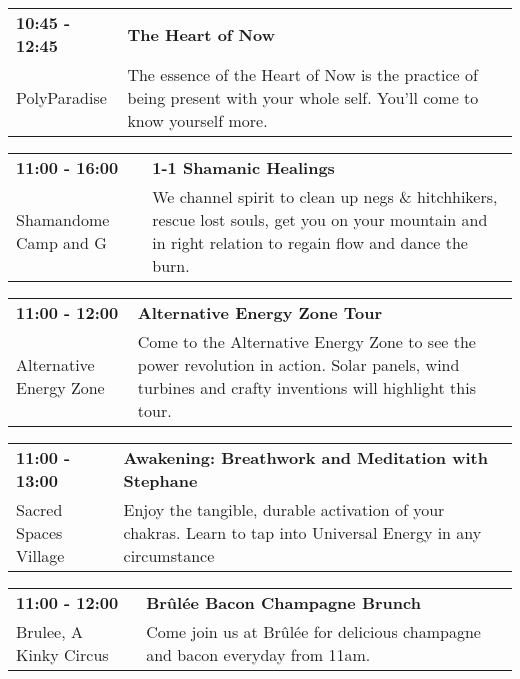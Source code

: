 \begin{tabular}{ p{1in} p{2.2in} }
    \textbf{10:45 - 12:45} & \textbf{The Heart of Now} \\
    PolyParadise \newline  & The essence of the Heart of Now is the practice of being present with your whole self. You'll come to know yourself more. \\
    \hline 
\end{tabular}
    
\begin{tabular}{ p{1in} p{2.2in} }
    \textbf{11:00 - 16:00} & \textbf{1-1 Shamanic Healings} \\
    Shamandome Camp \newline 615 and G & We channel spirit to clean up negs \& hitchhikers, rescue lost souls, get you on your mountain and in right relation to regain flow and dance the burn. \\
    \hline 
\end{tabular}
    
\begin{tabular}{ p{1in} p{2.2in} }
    \textbf{11:00 - 12:00} & \textbf{Alternative Energy Zone Tour} \\
    Alternative Energy Zone \newline  & Come to the Alternative Energy Zone to see the power revolution in action. Solar panels, wind turbines and crafty inventions will highlight this tour. \\
    \hline 
\end{tabular}
    
\begin{tabular}{ p{1in} p{2.2in} }
    \textbf{11:00 - 13:00} & \textbf{Awakening: Breathwork and Meditation with Stephane} \\
    Sacred Spaces Village \newline  & Enjoy the tangible, durable activation of your chakras. Learn to tap into Universal Energy in any circumstance \\
    \hline 
\end{tabular}
    
\begin{tabular}{ p{1in} p{2.2in} }
    \textbf{11:00 - 12:00} & \textbf{Br\^ul\'ee Bacon Champagne Brunch} \\
    Brulee, A Kinky Circus \newline  & Come join us at Br\^ul\'ee for delicious champagne and bacon everyday from 11am. \\
    \hline 
\end{tabular}
    
